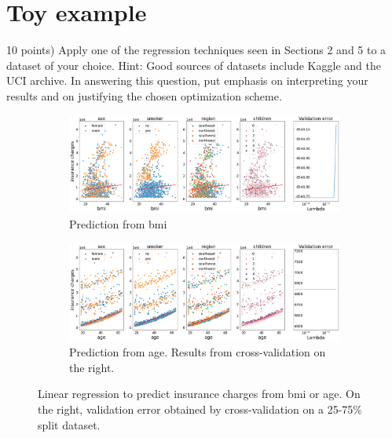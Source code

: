 \documentclass[10pt]{article}
\newenvironment{exercise}[2][Exercise]{\begin{trivlist}
  \item[\hskip \labelsep {\bfseries #1}\hskip \labelsep {\bfseries #2.}]}{\end{trivlist}}
\begin{document}
\section{Toy example}
\begin{exercise}{8} (10 points) Apply one of the regression techniques seen in Sections 2 and 5 to a dataset of your choice. Hint: Good sources of datasets
include Kaggle and the UCI archive. In answering this question, put emphasis
on interpreting your results and on justifying the chosen optimization scheme.

\begin{figure}[!ht]
     \centering
     \begin{subfigure}[b]{1\textwidth}
         \centering
         \includegraphics[width=\textwidth]{doc/images/bmi.png}
         \caption{Prediction from bmi}
         \label{fig:bmi}
     \end{subfigure}
     \hfill
     \begin{subfigure}[b]{1\textwidth}
         \centering
         \includegraphics[width=\textwidth]{doc/images/age.png}
         \caption{Prediction from age. Results from cross-validation on the right. }
         \label{fig:age}
     \end{subfigure}
        \caption{Linear regression to predict insurance charges from bmi or age. On the right, validation error obtained by cross-validation on a 25-75\% split dataset. }
        \label{fig:age-bmi-raw}
\end{figure}



\end{exercise}
\end{document}
